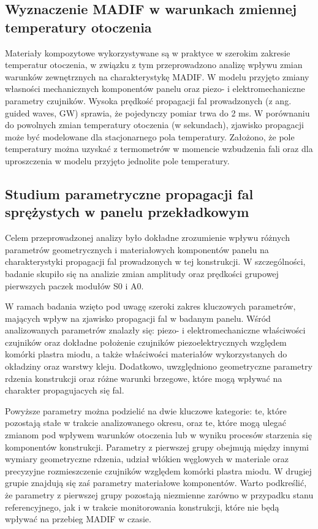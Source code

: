 \documentclass[a4paper,11pt]{article}
\begin{document}
\subsection{Wyznaczenie MADIF w warunkach zmiennej temperatury otoczenia}
Materiały kompozytowe wykorzystywane są w praktyce w szerokim zakresie temperatur otoczenia, w związku z tym przeprowadzono analizę wpływu zmian warunków zewnętrznych na charakterystykę MADIF. W modelu przyjęto zmiany własności mechanicznych komponentów panelu oraz piezo- i elektromechaniczne parametry czujników.
Wysoka prędkość propagacji fal prowadzonych  (z ang. guided waves, GW) sprawia, że pojedynczy pomiar trwa do 2 ms.
W porównaniu do powolnych zmian temperatury otoczenia (w sekundach), zjawisko propagacji może być modelowane dla stacjonarnego pola temperatury. Założono, że pole temperatury można uzyskać z termometrów w momencie wzbudzenia fali oraz dla uproszczenia w modelu przyjęto jednolite pole temperatury.

\subsection{Studium parametryczne propagacji fal sprężystych w panelu przekładkowym}
Celem przeprowadzonej analizy było dokładne zrozumienie wpływu różnych parametrów geometrycznych i materiałowych komponentów panelu na charakterystyki propagacji fal prowadzonych w tej konstrukcji. W szczególności, badanie skupiło się na analizie zmian amplitudy oraz prędkości grupowej pierwszych paczek modułów S0 i A0.

W ramach badania wzięto pod uwagę szeroki zakres kluczowych parametrów, mających wpływ na zjawisko propagacji fal w badanym panelu. Wśród analizowanych parametrów znalazły się: piezo- i elektromechaniczne właściwości czujników oraz dokładne położenie czujników piezoelektrycznych względem komórki plastra miodu, a także właściwości materiałów wykorzystanych do okładziny oraz warstwy kleju. Dodatkowo, uwzględniono geometryczne parametry rdzenia konstrukcji oraz różne warunki brzegowe, które mogą wpływać na charakter propagujacych się fal.

Powyższe parametry można podzielić na dwie kluczowe kategorie: te, które pozostają stałe w trakcie analizowanego okresu, oraz te, które mogą ulegać zmianom pod wpływem warunków otoczenia lub w wyniku procesów starzenia się komponentów konstrukcji. Parametry z pierwszej grupy obejmują między innymi wymiary geometryczne rdzenia, udział włókien węglowych w materiale oraz precyzyjne rozmieszczenie czujników względem komórki plastra miodu. W drugiej grupie znajdują się zaś parametry materiałowe komponentów.
Warto podkreślić, że parametry z pierwszej grupy pozostają niezmienne zarówno w przypadku stanu referencyjnego, jak i w trakcie monitorowania konstrukcji, które nie będą wpływać na przebieg MADIF w czasie.
\end{document}
